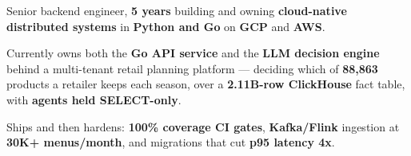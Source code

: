 \begin{zitemize}
    \item Senior backend engineer, \textbf{5 years} building and owning \textbf{cloud-native distributed systems} in \textbf{Python and Go} on \textbf{GCP} and \textbf{AWS}.
    \item Currently owns both the \textbf{Go API service} and the \textbf{LLM decision engine} behind a multi-tenant retail planning platform --- deciding which of \textbf{88,863} products a retailer keeps each season, over a \textbf{2.11B-row ClickHouse} fact table, with \textbf{agents held SELECT-only}.
    \item Ships and then hardens: \textbf{100\% coverage CI gates}, \textbf{Kafka/Flink} ingestion at \textbf{30K+ menus/month}, and migrations that cut \textbf{p95 latency 4x}.
\end{zitemize}
